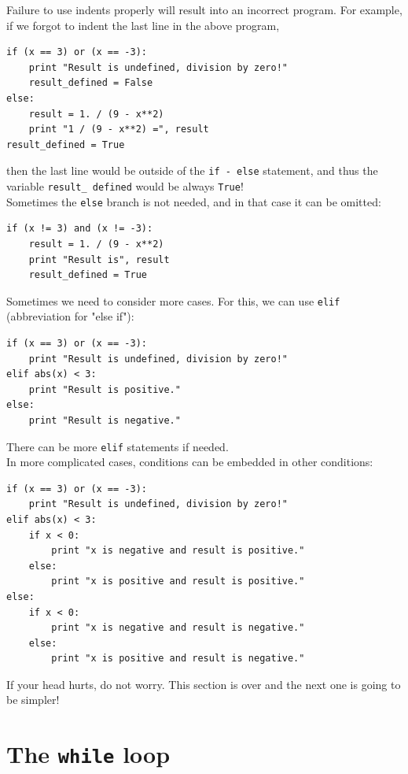 Failure to use indents properly will result into an incorrect program. For 
example, if we forgot to indent the last line in the above program,

\begin{verbatim}
if (x == 3) or (x == -3):
    print "Result is undefined, division by zero!"
    result_defined = False
else:
    result = 1. / (9 - x**2)
    print "1 / (9 - x**2) =", result
result_defined = True
\end{verbatim}
then the last line would be outside of the {\tt if - else} statement, and
thus the variable {\tt result\_ defined} would be always {\tt True}!\\

\noindent
Sometimes the {\tt else} branch is not needed, and in that case it can be omitted:

\begin{verbatim}
if (x != 3) and (x != -3):
    result = 1. / (9 - x**2)
    print "Result is", result
    result_defined = True
\end{verbatim}
Sometimes we need to consider more cases. For this, we can use {\tt elif}
(abbreviation for "else if"):

\begin{verbatim}
if (x == 3) or (x == -3):
    print "Result is undefined, division by zero!"
elif abs(x) < 3:
    print "Result is positive."
else:
    print "Result is negative."
\end{verbatim}
There can be more {\tt elif} statements if needed. \\

\noindent
In more complicated cases, conditions can be embedded in other conditions:

\begin{verbatim}
if (x == 3) or (x == -3):
    print "Result is undefined, division by zero!"
elif abs(x) < 3:
    if x < 0:
        print "x is negative and result is positive."
    else: 
        print "x is positive and result is positive."
else:
    if x < 0:
        print "x is negative and result is negative."
    else: 
        print "x is positive and result is negative."
\end{verbatim}
If your head hurts, do not worry. This section is over 
and the next one is going to be simpler!

\section{The {\tt while} loop}\label{sec:while}

